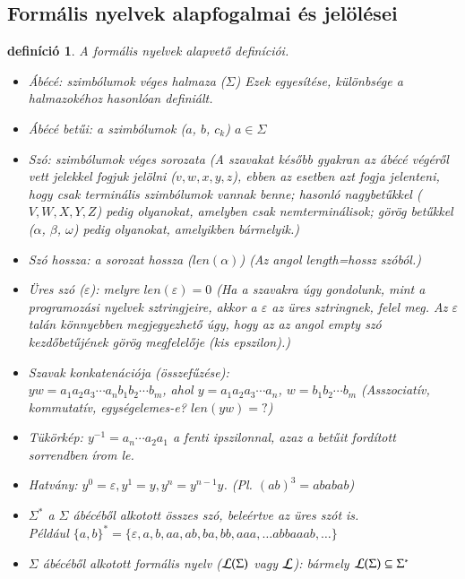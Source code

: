 \documentclass[a4paper]{article}
\newtheorem{definicio}{definíció}[section]
\begin{document}
\subsection*{Formális nyelvek alapfogalmai és jelölései}
\begin{definicio} A formális nyelvek alapvető definíciói.
\par
\begin{itemize}
\item Ábécé: szimbólumok véges halmaza ($\Sigma$) Ezek egyesítése,
különbsége a halmazokéhoz hasonlóan definiált.
\item Ábécé betűi: a szimbólumok ($a$, $b$, $c_k$)\: $a\in \Sigma$
\item Szó: szimbólumok véges sorozata
(A szavakat később gyakran az ábécé végéről vett jelekkel fogjuk
jelölni ($v, w, x, y, z$), ebben az esetben azt fogja jelenteni, hogy csak terminális
szimbólumok vannak benne; hasonló nagybetűkkel ($V, W, X, Y, Z$) pedig
olyanokat, amelyben csak nemterminálisok; görög betűkkel  ($\alpha$,
$\beta$, $\omega$) pedig olyanokat, amelyikben bármelyik.)
\item Szó hossza: a sorozat hossza ($len(\alpha)$) (Az angol
length=hossz szóból.) 
\item Üres szó ($\varepsilon$): melyre $len(\varepsilon) = 0$ (Ha a
szavakra úgy gondolunk, mint a programozási nyelvek sztringjeire, akkor
a $\varepsilon$ az üres sztringnek, felel meg. Az $\varepsilon$ talán
könnyebben megjegyezhető úgy, hogy az az angol empty szó kezdőbetűjének
görög megfelelője (kis epszilon).)
\item Szavak konkatenációja (összefűzése):\\ $y w = a_1 a_2 a_3 \cdots a_n
	b_1 b_2 \cdots b_m$,
	ahol  $y =a_1 a_2 a_3 \cdots a_n$, $w = b_1 b_2 \cdots b_m$
	(Asszociatív, kommutatív, egységelemes-e? $len(y w)=?$)
\item Tükörkép: $y^{-1}=a_n \cdots a_2 a_1$ a fenti ipszilonnal, azaz a
betűit fordított sorrendben írom le.
\item Hatvány: $y^0=\varepsilon, y^1=y,
	y^n=y^{n-1}y$. (Pl. $(ab)^3=ababab$)
\item $\Sigma^*$ a $\Sigma$ ábécéből alkotott összes szó, beleértve az
    üres szót is.\\
    Például $\{a,b\}^*=\{\varepsilon, a, b, aa, ab, ba, bb, aaa, \ldots
    abbaaab, \ldots\}$
\item $\Sigma$ ábécéből alkotott formális nyelv (${\cal L}(\Sigma)$ vagy ${\cal L}$):
	bármely ${\cal L}(\Sigma) \subseteq \Sigma^*$
\end{itemize}
\end{definicio}
\end{document}
